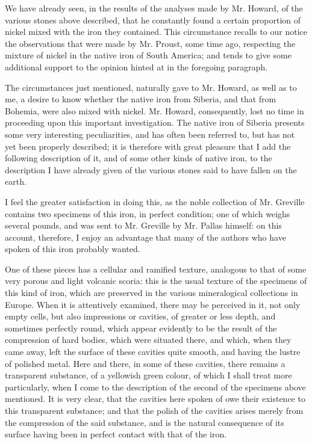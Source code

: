 \documentclass[a4paper, 12pt, oneside]{article}
\begin{document}
We have already seen, in the results of the analyses made by Mr. Howard, of the various stones above described, that he constantly found a certain proportion of nickel mixed with the iron they contained. This circumstance recalls to our notice the observations that were made by Mr. Proust, some time ago, respecting the mixture of nickel in the native iron of South America; and tends to give some additional support to the opinion hinted at in the foregoing paragraph.

The circumstances just mentioned, naturally gave to Mr. Howard, as well as to me, a desire to know whether the native iron from Siberia, and that from Bohemia, were also mixed with nickel. Mr. Howard, consequently, lost no time in proceeding upon this important investigation. The native iron of Siberia presents some very interesting peculiarities, and has often been referred to, but has not yet been properly described; it is therefore with great pleasure that I add the following description of it, and of some other kinds of native iron, to the description I have already given of the various stones said to have fallen on the earth.

I feel the greater satisfaction in doing this, as the noble collection of Mr. Greville contains two specimens of this iron, in perfect condition; one of which weighs several pounds, and was sent to Mr. Greville by Mr. Pallas himself: on this account, therefore, I enjoy an advantage that many of the authors who have spoken of this iron probably wanted.

One of these pieces has a cellular and ramified texture, analogous to that of some very porous and light volcanic scoria: this is the usual texture of the specimens of this kind of iron, which are preserved in the various mineralogical collections in Europe. When it is attentively examined, there may be perceived in it, not only empty cells, but also impressions or cavities, of greater or less depth, and sometimes perfectly round, which appear evidently to be the result of the compression of hard bodies, which were situated there, and which, when they came away, left the surface of these cavities quite smooth, and having the lustre of polished metal. Here and there, in some of these cavities, there remains a transparent substance, of a yellowish green colour, of which I shall treat more particularly, when I come to the description of the second of the specimens above mentioned. It is very clear, that the cavities here spoken of owe their existence to this transparent substance; and that the polish of the cavities arises merely from the compression of the said substance, and is the natural consequence of its surface having been in perfect contact with that of the iron.
\end{document}
